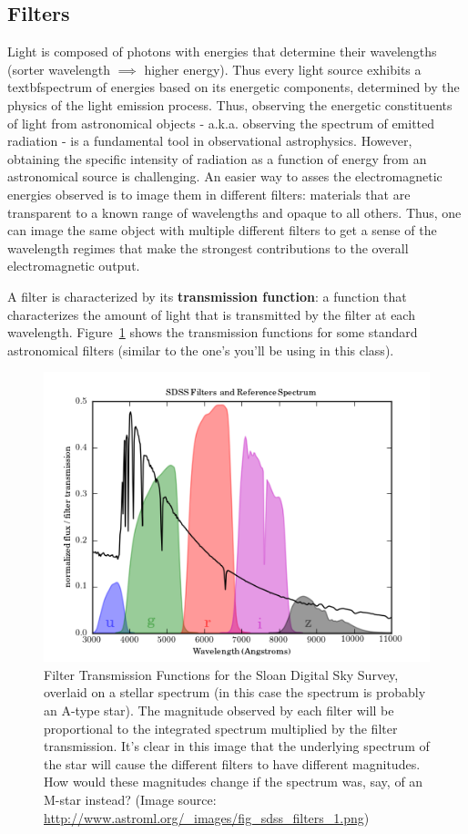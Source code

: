 \subsection{Filters}
Light is composed of photons with energies that determine their wavelengths (sorter wavelength $\implies$ higher energy). Thus every light source exhibits a textbf{spectrum} of energies based on its energetic components, determined by the physics of the light emission process. Thus, observing the energetic constituents of light from astronomical objects - a.k.a. observing the spectrum of emitted radiation - is a fundamental tool in observational astrophysics. However, obtaining the specific intensity of radiation as a function of energy from an astronomical source is challenging. An easier way to asses the electromagnetic energies observed is to image them in different filters: materials that are transparent to a known range of wavelengths and opaque to all others. Thus, one can image the same object with multiple different filters to get a sense of the wavelength regimes that make the strongest contributions to the overall electromagnetic output. 

A filter is characterized by its \textbf{transmission function}: a function that characterizes the amount of light that is transmitted by the filter at each wavelength. Figure~\ref{sot:fig:filters} shows the transmission functions for some standard astronomical filters (similar to the one's you'll be using in this class).

\begin{figure}
	\centering
	\includegraphics{small-optical-telescopes/fig_sdss_filters_1.png}
	\caption{Filter Transmission Functions for the Sloan Digital Sky Survey, overlaid on a stellar spectrum (in this case the spectrum is probably an
		A-type star). The magnitude observed by each filter will be proportional to the integrated spectrum multiplied by the filter transmission. It's clear in this image that the underlying spectrum of the star will cause the different filters to have different magnitudes. How would these magnitudes change if the spectrum was, say, of an M-star instead? (Image source: \url{http://www.astroml.org/\_images/fig\_sdss\_filters\_1.png})}\label{sot:fig:filters}
\end{figure}


